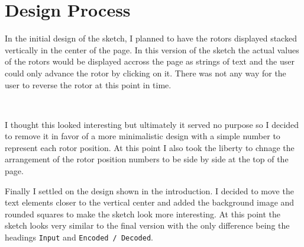\documentclass[12pt,a4paper]{article}
\begin{document}
	\section{Design Process}
		In the initial design of the sketch, I planned to have the rotors displayed stacked 
		vertically in the center of the page. In this version of the sketch the actual values 
		of the rotors would be displayed accross the page as strings of text and the user could
		only advance the rotor by clicking on it. There was not any way for the user to reverse 
		the rotor at this point in time.\\

		\begin{center}
			\\
		\end{center}
		\newpage
		I thought this looked interesting but ultimately it served no purpose so I decided to 
		remove it in favor of a more minimalistic design with a simple number to represent 
		each rotor position. At this point I also took the liberty to chnage the arrangement of 
		the rotor position numbers to be side by side at the top of the page.\\
		
		\begin{center}
			\par
		\end{center}
		\vspace{0.5cm}
		Finally I settled on the design shown in the introduction. I decided to move the text 
		elements closer to the vertical center and added the background image and rounded squares 
		to make the sketch look more interesting. At this point the sketch looks very similar to the 
		final version with the only difference being the headings \texttt{Input} and 
		\texttt{Encoded / Decoded}.\\
\end{document}
